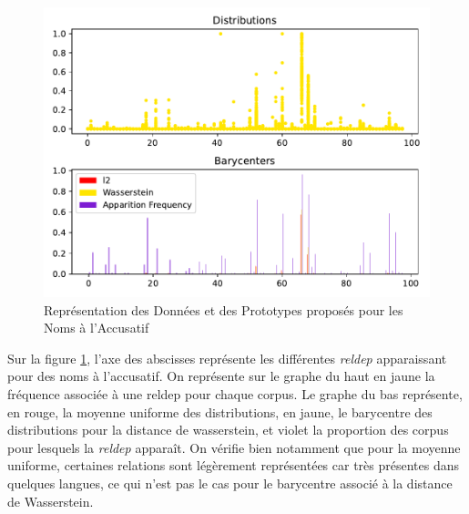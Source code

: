 \documentclass{cours}
\begin{document}
\begin{figure}
\centering
\includegraphics{Figures/Visualisations/Nouns_Wasserstein_Barycenter_Acc}
\caption{Représentation des Données et des Prototypes proposés pour les Noms à l'Accusatif}
\label{fig_proto}
\end{figure}

Sur la figure \ref{fig_proto}, l'axe des abscisses représente les différentes \textit{reldep} apparaissant pour des noms à l'accusatif.
On représente sur le graphe du haut en jaune la fréquence associée à une reldep pour chaque corpus.
Le graphe du bas représente, en rouge, la moyenne uniforme des distributions, en jaune, le barycentre des distributions pour la distance de wasserstein, et violet la proportion des corpus pour lesquels la \textit{reldep} apparaît.
On vérifie bien notamment que pour la moyenne uniforme, certaines relations sont légèrement représentées car très présentes dans quelques langues, ce qui n'est pas le cas pour le barycentre associé à la distance de Wasserstein.
\end{document}
